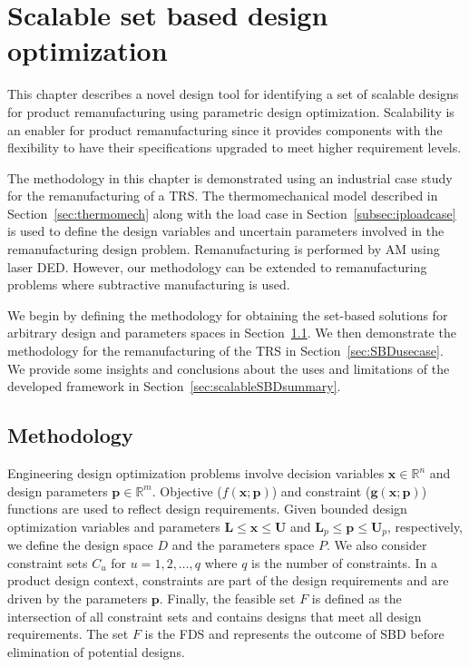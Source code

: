 \chapter{Scalable set based design optimization}
\label{ch:scalableSBD}

This chapter describes a novel design tool for identifying a set of scalable designs for product remanufacturing using parametric design optimization. Scalability is an enabler for product remanufacturing since it provides components with the flexibility to have their specifications upgraded to meet higher requirement levels.

The methodology in this chapter is demonstrated using an industrial case study for the remanufacturing of a \ac{TRS}. The thermomechanical model described in Section~\ref{sec:thermomech} along with the load case in Section~\ref{subsec:iploadcase} is used to define the design variables and uncertain parameters involved in the remanufacturing design problem. Remanufacturing is performed by \ac{AM} using laser \ac{DED}. However, our methodology can be extended to remanufacturing problems where subtractive manufacturing is used.

We begin by defining the methodology for obtaining the set-based solutions for arbitrary design and parameters spaces in Section~\ref{sec:SBDmethods}. We then demonstrate the methodology for the remanufacturing of the \ac{TRS} in Section~\ref{sec:SBDusecase}. We provide some insights and conclusions about the uses and limitations of the developed framework in Section~\ref{sec:scalableSBDsummary}.

\section{Methodology} \label{sec:SBDmethods}

Engineering design optimization problems involve decision variables $\mathbf{x}  \in \mathbb{R}^n$ and design parameters ${\mathbf{p}}  \in \mathbb{R}^m$. Objective (${f}(\mathbf{x};\mathbf{p})$) and constraint ($\mathbf{g}(\mathbf{x};\mathbf{p})$) functions are used to reflect design requirements. Given bounded design optimization variables and parameters $\mathbf{L} \leq \mathbf{x} \leq \mathbf{U}$ and $\mathbf{L}_p \leq \mathbf{p} \leq \mathbf{U}_p$, respectively, we define the design space $\mathit{D}$ and the parameters space $\mathit{P}$. We also consider constraint sets $\mathit{C}_u$ for $u = 1,2,\ldots,q$ where $q$ is the number of constraints. In a product design context, constraints are part of the design requirements and are driven by the parameters $\mathbf{p}$. Finally, the feasible set $\mathit{F}$ is defined as the intersection of all constraint sets and contains designs that meet all design requirements. The set $\mathit{F}$ is the \ac{FDS} and represents the outcome of \ac{SBD} before elimination of potential designs. 

